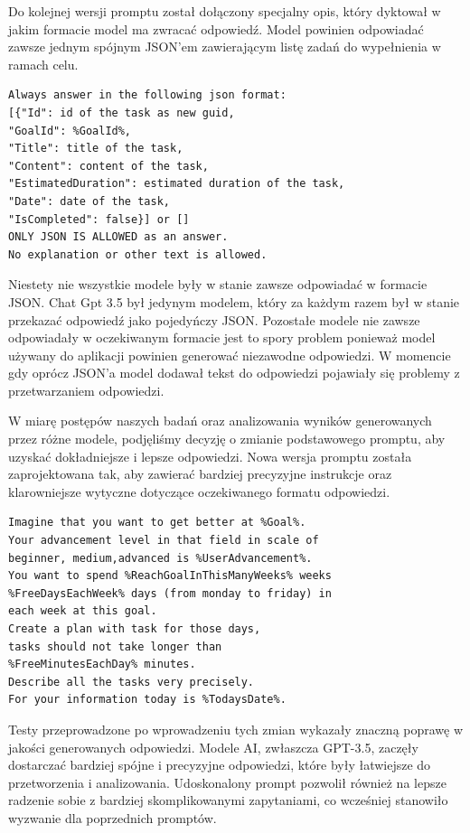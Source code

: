 Do kolejnej wersji promptu został dołączony specjalny opis, który dyktował w jakim formacie model ma zwracać odpowiedź. Model powinien odpowiadać zawsze jednym spójnym JSON'em zawierającym listę zadań do wypełnienia w ramach celu. 

\begin{lstlisting}[language=html, caption=Część promptu odpowiedzialna za formatowanie, linewidth=160mm]
Always answer in the following json format:
[{"Id": id of the task as new guid,
"GoalId": %GoalId%,
"Title": title of the task,
"Content": content of the task,
"EstimatedDuration": estimated duration of the task,
"Date": date of the task,
"IsCompleted": false}] or []
ONLY JSON IS ALLOWED as an answer. 
No explanation or other text is allowed.
\end{lstlisting}

Niestety nie wszystkie modele były w stanie zawsze odpowiadać w formacie JSON. Chat Gpt 3.5 był jedynym modelem, który za każdym razem był w stanie przekazać odpowiedź jako pojedyńczy JSON. Pozostałe modele nie zawsze odpowiadały w oczekiwanym formacie jest to spory problem ponieważ model używany do aplikacji powinien generować niezawodne odpowiedzi. W momencie gdy oprócz JSON'a model dodawał tekst do odpowiedzi pojawiały się problemy z przetwarzaniem odpowiedzi.

W miarę postępów naszych badań oraz analizowania wyników generowanych przez różne modele, podjęliśmy decyzję o zmianie podstawowego promptu, aby uzyskać dokładniejsze i lepsze odpowiedzi. Nowa wersja promptu została zaprojektowana tak, aby zawierać bardziej precyzyjne instrukcje oraz klarowniejsze wytyczne dotyczące oczekiwanego formatu odpowiedzi.

\begin{lstlisting}[language=html, caption=Nowy podstawowy prompt, linewidth=140mm]
Imagine that you want to get better at %Goal%. 
Your advancement level in that field in scale of 
beginner, medium,advanced is %UserAdvancement%. 
You want to spend %ReachGoalInThisManyWeeks% weeks 
%FreeDaysEachWeek% days (from monday to friday) in 
each week at this goal.
Create a plan with task for those days, 
tasks should not take longer than
%FreeMinutesEachDay% minutes.
Describe all the tasks very precisely. 
For your information today is %TodaysDate%.
\end{lstlisting}

Testy przeprowadzone po wprowadzeniu tych zmian wykazały znaczną poprawę w jakości generowanych odpowiedzi. Modele AI, zwłaszcza GPT-3.5, zaczęły dostarczać bardziej spójne i precyzyjne odpowiedzi, które były łatwiejsze do przetworzenia i analizowania. Udoskonalony prompt pozwolił również na lepsze radzenie sobie z bardziej skomplikowanymi zapytaniami, co wcześniej stanowiło wyzwanie dla poprzednich promptów.

